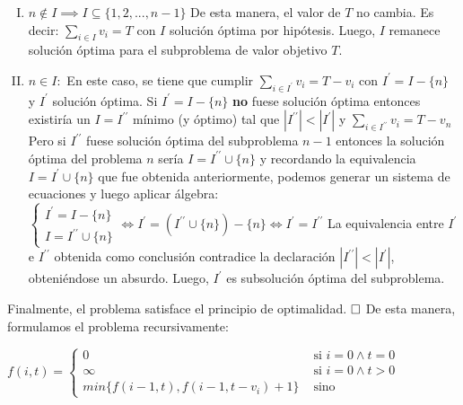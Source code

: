 \begin{enumerate}[I)]
\item $n \notin I \implies I \subseteq \{1, 2, ..., n-1\}$
	\vskip 0pt
	De esta manera, el valor de $T$ no cambia. Es decir: $\sum_{i \in I}v_{i}=T$ con $I$ solución óptima por hipótesis. Luego, $I$ remanece solución óptima para el subproblema de valor objetivo $T$.
\item $n \in I:$
	\vskip 0pt
	En este caso, se tiene que cumplir $\sum_{i \in I^\prime}v_{i}=T-v_{i}$ con $I^\prime=I-\{n\}$ y $I^\prime$ solución óptima.
	\vskip 8pt
	Si $I^\prime=I-\{n\}$ \textbf{no} fuese solución óptima entonces existiría un $I=I^{\prime\prime}$ mínimo (y óptimo) tal que $|I^{\prime\prime}| < |I^\prime|$ y $\sum_{i \in I^{\prime\prime}}v_{i} = T - v_{n}$
	\vskip 8pt
	Pero si $I^{\prime\prime}$ fuese solución óptima del subproblema $n-1$ entonces la solución óptima del problema $n$ sería $I = I^{\prime\prime} \cup \{n\}$ y recordando la equivalencia $I=I^\prime \cup \{n\}$ que fue obtenida anteriormente, podemos generar un sistema de ecuaciones y luego aplicar álgebra:
	\vskip 8pt
	$
		\begin{cases}
			I^\prime = I - \{n\} \\ 
			I = I^{\prime\prime} \cup \{n\}
		\end{cases}
		\iff
		I^\prime = (I^{\prime\prime} \cup \{n\}) - \{n\} \iff I^\prime = I^{\prime\prime}
	$
	\vskip 8pt
	La equivalencia entre $I^\prime$ e $I^{\prime\prime}$ obtenida como conclusión contradice la declaración $|I^{\prime\prime}| < |I^\prime|$, obteniéndose un absurdo. Luego, $I^\prime$ es subsolución óptima del subproblema.
\end{enumerate}
Finalmente, el problema satisface el principio de optimalidad.
\vskip 8pt
$\qedwhite$
\vskip 8pt
De esta manera, formulamos el problema recursivamente:
\vskip 8pt
\begin{center}
	$
	f(i, t) =
	\begin{cases}
		0 & \mbox{ si } i = 0 \wedge t = 0 \\
		\infty & \mbox{ si } i = 0 \wedge t > 0 \\
		min\{f(i - 1, t), f(i - 1, t - v_{i}) + 1\}  & \mbox{ sino}
	\end{cases}
$
\end{center}

